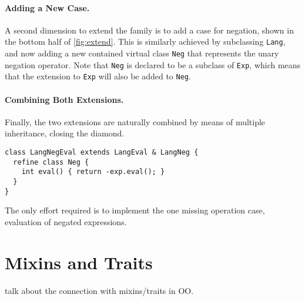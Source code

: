 \paragraph{Adding a New Case.}

A second dimension to extend the family is to add a case for negation, shown in
the bottom half of \cref{fig:extend}. This is similarly achieved by subclassing
\lstinline{Lang}, and now adding a new contained virtual class \lstinline{Neg}
that represents the unary negation operator. Note that \lstinline{Neg} is
declared to be a subclass of \lstinline{Exp}, which means that the extension to
\lstinline{Exp} will also be added to \lstinline{Neg}.


\paragraph{Combining Both Extensions.}

Finally, the two extensions are naturally combined by means of
multiple inheritance, closing the diamond.
\begin{lstlisting}[language=gbeta]
class LangNegEval extends LangEval & LangNeg {
  refine class Neg {
    int eval() { return -exp.eval(); }
  }
}
\end{lstlisting}
The only effort required is to implement the one missing operation
case, evaluation of negated expressions.



\section{Mixins and Traits}
\label{sec:bg:mixin:trait}

talk about the connection with mixins/traits in OO.



